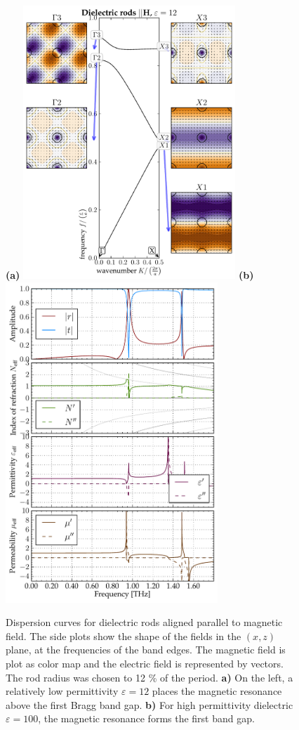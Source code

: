 \documentclass[letterpaper,12pt]{report}
\begin{document}
\begin{figure}[ht] \caption{Dispersion curves for dielectric rods aligned parallel to magnetic field. The side plots show the shape of the fields in the $(x,z)$ plane, at the frequencies of the band edges. The magnetic field is plot as color map and the electric field is represented by vectors. The rod radius was chosen to 12 \% of the period. \textbf{a)} On the left, a relatively low permittivity $\varepsilon = 12$ places the magnetic resonance above the first Bragg band gap. \textbf{b)} For high permittivity dielectric $\varepsilon = 100$, the magnetic resonance forms the first band gap. } \label{fg_rodh} \centering 
\textbf{(a)}	\includegraphics[width=8cm]{img/HRods_eps012_R12_PWEM.pdf}
\textbf{(b)}	\includegraphics[width=8cm]{img/HRods_eps100_R12_FDTD.pdf}
\end{figure}
\end{document}
